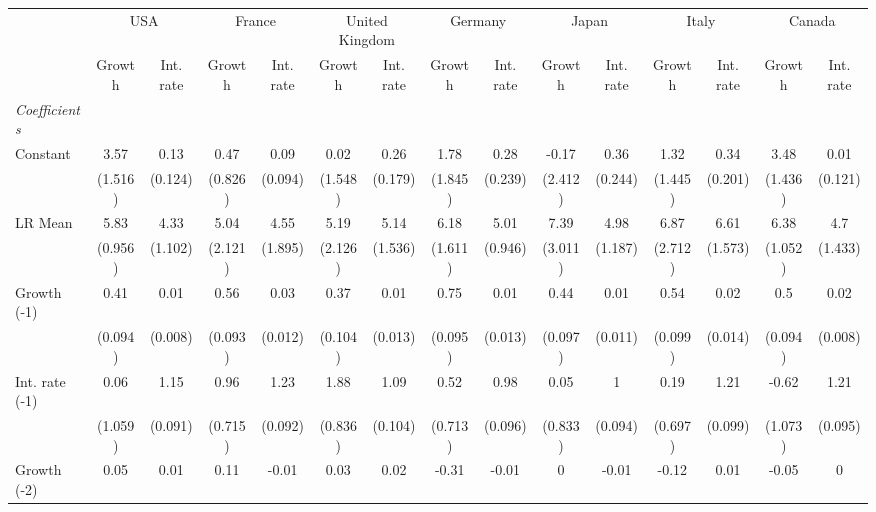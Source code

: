 \begin{table}[htbp] 
	\centering
	 \scriptsize
	\begin{tabular}{@{\extracolsep{4pt}}lcccccccccccccc@{}}		\hline\hline
		 		 & \multicolumn{2}{c}{USA} &\multicolumn{2}{c}{France} &\multicolumn{2}{c}{United Kingdom} &\multicolumn{2}{c}{Germany} &\multicolumn{2}{c}{Japan} &\multicolumn{2}{c}{Italy} &\multicolumn{2}{c}{Canada} \\ 
 		 & Growth 	 & Int. rate 	 & Growth 	 & Int. rate 	 & Growth 	 & Int. rate 	 & Growth 	 & Int. rate 	 & Growth 	 & Int. rate 	 & Growth 	 & Int. rate 	 & Growth 	 & Int. rate\\\cline{2-3}\cline{4-5}\cline{6-7}\cline{8-9}\cline{10-11}\cline{12-13}\cline{14-15}
\rule{0pt}{4ex} 
 \emph{Coefficients} 	  		 & 		 & 		 & 		 & 		 & 		 & 		 & 		 & 		 & 		 & 		 & 		 & 		 & 		 &\\ 
\quad Constant 	 & 3.57 	 & 0.13 	 & 0.47 	 & 0.09 	 & 0.02 	 & 0.26 	 & 1.78 	 & 0.28 	 & -0.17 	 & 0.36 	 & 1.32 	 & 0.34 	 & 3.48 	 & 0.01	 \\ 
 		 & (1.516) 	 & (0.124) 	 & (0.826) 	 & (0.094) 	 & (1.548) 	 & (0.179) 	 & (1.845) 	 & (0.239) 	 & (2.412) 	 & (0.244) 	 & (1.445) 	 & (0.201) 	 & (1.436) 	 & (0.121) 	 \\ 
\quad LR Mean 	 & 5.83 	 & 4.33 	 & 5.04 	 & 4.55 	 & 5.19 	 & 5.14 	 & 6.18 	 & 5.01 	 & 7.39 	 & 4.98 	 & 6.87 	 & 6.61 	 & 6.38 	 & 4.7	 \\ 
 		 & (0.956) 	 & (1.102) 	 & (2.121) 	 & (1.895) 	 & (2.126) 	 & (1.536) 	 & (1.611) 	 & (0.946) 	 & (3.011) 	 & (1.187) 	 & (2.712) 	 & (1.573) 	 & (1.052) 	 & (1.433) 	 \\ 
\quad Growth (-1) 	 &0.41 	 & 0.01 	 & 0.56 	 & 0.03 	 & 0.37 	 & 0.01 	 & 0.75 	 & 0.01 	 & 0.44 	 & 0.01 	 & 0.54 	 & 0.02 	 & 0.5 	 & 0.02	 \\ 
 		 & (0.094) 	 & (0.008) 	 & (0.093) 	 & (0.012) 	 & (0.104) 	 & (0.013) 	 & (0.095) 	 & (0.013) 	 & (0.097) 	 & (0.011) 	 & (0.099) 	 & (0.014) 	 & (0.094) 	 & (0.008) 	 \\ 
\quad Int. rate (-1) 	 &0.06 	 & 1.15 	 & 0.96 	 & 1.23 	 & 1.88 	 & 1.09 	 & 0.52 	 & 0.98 	 & 0.05 	 & 1 	 & 0.19 	 & 1.21 	 & -0.62 	 & 1.21	 \\ 
 		 & (1.059) 	 & (0.091) 	 & (0.715) 	 & (0.092) 	 & (0.836) 	 & (0.104) 	 & (0.713) 	 & (0.096) 	 & (0.833) 	 & (0.094) 	 & (0.697) 	 & (0.099) 	 & (1.073) 	 & (0.095) 	 \\ 
\quad Growth (-2) 	 &0.05 	 & 0.01 	 & 0.11 	 & -0.01 	 & 0.03 	 & 0.02 	 & -0.31 	 & -0.01 	 & 0 	 & -0.01 	 & -0.12 	 & 0.01 	 & -0.05 	 & 0	 \\ 

\end{tabular}
\end{table}
